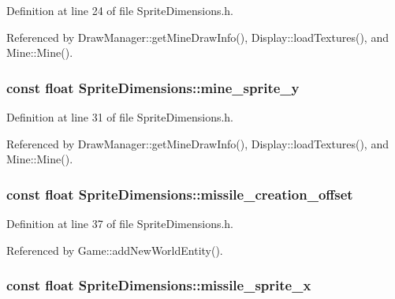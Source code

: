 Definition at line 24 of file Sprite\-Dimensions.\-h.



Referenced by Draw\-Manager\-::get\-Mine\-Draw\-Info(), Display\-::load\-Textures(), and Mine\-::\-Mine().

\hypertarget{classSpriteDimensions_a256b5245430fc54ae2cace272260dbe1}{
\subsubsection[{mine\-\_\-sprite\-\_\-y}]{\setlength{\rightskip}{0pt plus 5cm}const float Sprite\-Dimensions\-::mine\-\_\-sprite\-\_\-y}}\label{classSpriteDimensions_a256b5245430fc54ae2cace272260dbe1}


Definition at line 31 of file Sprite\-Dimensions.\-h.



Referenced by Draw\-Manager\-::get\-Mine\-Draw\-Info(), Display\-::load\-Textures(), and Mine\-::\-Mine().

\hypertarget{classSpriteDimensions_a59055b28d0d2307c1e4f4b04ad93488e}{
\subsubsection[{missile\-\_\-creation\-\_\-offset}]{\setlength{\rightskip}{0pt plus 5cm}const float Sprite\-Dimensions\-::missile\-\_\-creation\-\_\-offset}}\label{classSpriteDimensions_a59055b28d0d2307c1e4f4b04ad93488e}


Definition at line 37 of file Sprite\-Dimensions.\-h.



Referenced by Game\-::add\-New\-World\-Entity().

\hypertarget{classSpriteDimensions_a0c406c32caf5ea7841c763100dd83ecf}{
\subsubsection[{missile\-\_\-sprite\-\_\-x}]{\setlength{\rightskip}{0pt plus 5cm}const float Sprite\-Dimensions\-::missile\-\_\-sprite\-\_\-x}}\label{classSpriteDimensions_a0c406c32caf5ea7841c763100dd83ecf}


